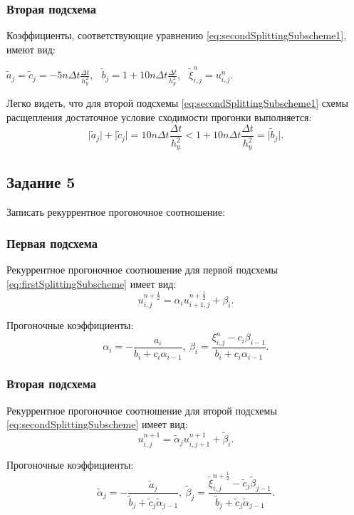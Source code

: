 \documentclass[12pt, a4paper]{report}
\begin{document}
	\subsubsection*{Вторая подсхема}
	\large
	Коэффициенты, соответствующие уравнению \eqref{eq:secondSplittingSubscheme1}, имеют вид:
	\small
	\begin{center}
		$\tilde{a}_{j}=\tilde{c}_{j}=-5n\Delta t\frac{\Delta t}{h_{y}^{2}}$, $\>$ $\tilde{b}_{j}=1 + 10n\Delta t\frac{\Delta t}{h_{y}^{2}}$, $\>$ $\tilde{\xi}_{i, j}^{n}=u_{i, j}^{n}$.
	\end{center}
	\par
	\large
	Легко видеть, что для второй подсхемы \eqref{eq:secondSplittingSubscheme1} схемы расщепления достаточное условие сходимости прогонки выполняется:
	\begin{equation*}
		\lvert \tilde{a}_{j} \rvert + \lvert \tilde{c}_{j} \rvert = 10n\Delta t\frac{\Delta t}{h_{y}^{2}} < 1 + 10n\Delta t\frac{\Delta t}{h_{y}^{2}} = \lvert \tilde{b}_{j} \rvert.
	\end{equation*}

	\subsection*{Задание 5}
	\large
	Записать рекуррентное прогоночное соотношение: \par
	\subsubsection*{Первая подсхема}
	\large
	Рекуррентное прогоночное соотношение для первой подсхемы \eqref{eq:firstSplittingSubscheme} имеет вид:
	\begin{equation*}
		u_{i, j}^{n+\frac{1}{2}} = \alpha_{i}u_{i+1, j}^{n+\frac{1}{2}} + \beta_{i}.
	\end{equation*}
	\par
	Прогоночные коэффициенты:
	\begin{equation*}
		\alpha_{i} = -\frac{a_{i}}{b_{i} + c_{i}\alpha_{i-1}}, \> \beta_{i} = \frac{\xi_{i, j}^{n} - c_{i}\beta_{i-1}}{b_{i} + c_{i}\alpha_{i-1}}.
	\end{equation*}
	\subsubsection*{Вторая подсхема}
	\large
	Рекуррентное прогоночное соотношение для второй подсхемы \eqref{eq:secondSplittingSubscheme} имеет вид:
	\begin{equation*}
		u_{i, j}^{n+1} = \tilde{\alpha}_{j}u_{i, j+1}^{n+1} + \tilde{\beta}_{i}.
	\end{equation*}
	\par
	Прогоночные коэффициенты:
	\begin{equation*}
		\tilde{\alpha}_{j} = -\frac{\tilde{a}_{j}}{\tilde{b}_{j} + \tilde{c}_{j}\tilde{\alpha}_{j-1}}, \> \tilde{\beta}_{j} = \frac{\tilde{\xi}_{i, j}^{n+\frac{1}{2}} - \tilde{c}_{j}\tilde{\beta}_{j-1}}{\tilde{b}_{j} + \tilde{c}_{j}\tilde{\alpha}_{j-1}}.
	\end{equation*}
\end{document}
